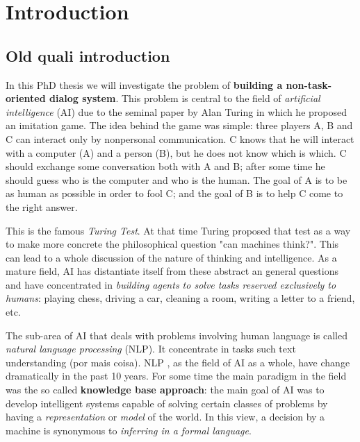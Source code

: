 \chapter{Introduction}
\label{ch:01-introduction}


\section{Old quali introduction}


In this PhD thesis we will investigate the problem of \textbf{building a non-task-oriented dialog system}. This problem is central to the field of \textit{artificial intelligence} (AI) due to the seminal paper by Alan Turing \cite{Turing} in which he proposed an imitation game. The idea behind the game was simple: three players A, B and C can interact only by nonpersonal communication. C knows that he will interact with a computer (A) and a person (B), but he does not know which is which. C should exchange some conversation both with A and B; after some time he should guess who is the computer and who is the human. The goal of A is to be as human as possible in order to fool C; and the goal of B is to help C come to the right answer.

\par This is the famous \textit{Turing Test}. At that time Turing proposed that test as a way to make more concrete the philosophical question "can machines think?". This can lead to a whole discussion of the nature of thinking and intelligence. As a mature field, AI has distantiate itself from these abstract an general questions and have concentrated in \textit{building agents to solve tasks reserved exclusively to humans}: playing chess, driving a car, cleaning a room, writing a letter to a friend, etc.    

\par The sub-area of AI that deals with problems involving human language is called \textit{natural language processing} (NLP). It concentrate in tasks such text understanding (por mais coisa). NLP , as the field of AI as a whole, have change dramatically in the past 10 years. For some time the main paradigm in the field was the so called \textbf{knowledge base approach}: the main goal of AI was to develop intelligent systems capable of solving certain classes of problems by having a \textit{representation} or \textit{model} of the world. In this view, a decision by a machine is synonymous to \textit{inferring in a formal language}\cite{McCarthy}.


